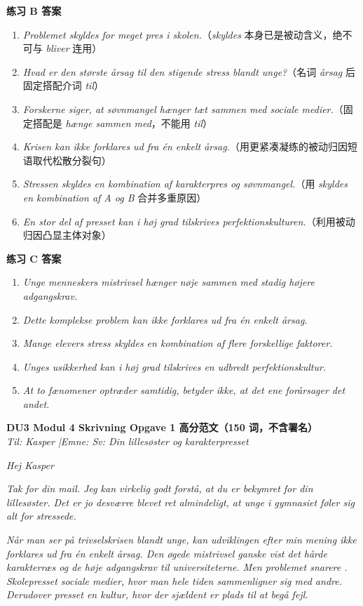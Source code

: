 \begin{answerbox}
\textbf{练习 B 答案}
\begin{enumerate}
  \item \textit{Problemet skyldes for meget pres i skolen.}（\textit{skyldes} 本身已是被动含义，绝不可与 \textit{bliver} 连用）
  \item \textit{Hvad er den største årsag til den stigende stress blandt unge?}（名词 \textit{årsag} 后固定搭配介词 \textit{til}）
  \item \textit{Forskerne siger, at søvnmangel hænger tæt sammen med sociale medier.}（固定搭配是 \textit{hænge sammen med}，不能用 \textit{til}）
  \item \textit{Krisen kan ikke forklares ud fra én enkelt årsag.}（用更紧凑凝练的被动归因短语取代松散分裂句）
  \item \textit{Stressen skyldes en kombination af karakterpres og søvnmangel.}（用 \textit{skyldes en kombination af A og B} 合并多重原因）
  \item \textit{En stor del af presset kan i høj grad tilskrives perfektionskulturen.}（利用被动归因凸显主体对象）
\end{enumerate}

\textbf{练习 C 答案}
\begin{enumerate}
  \item \textit{Unge menneskers mistrivsel hænger nøje sammen med stadig højere adgangskrav.}
  \item \textit{Dette komplekse problem kan ikke forklares ud fra én enkelt årsag.}
  \item \textit{Mange elevers stress skyldes en kombination af flere forskellige faktorer.}
  \item \textit{Unges usikkerhed kan i høj grad tilskrives en udbredt perfektionskultur.}
  \item \textit{At to fænomener optræder samtidig, betyder ikke, at det ene forårsager det andet.}
\end{enumerate}

\textbf{DU3 Modul 4 Skrivning Opgave 1 高分范文（150 词，不含署名）}\\
\textit{Til: Kasper \quad|\quad Emne: Sv: Din lillesøster og karakterpresset}

\textit{Hej Kasper}

\textit{Tak for din mail. Jeg kan virkelig godt forstå, at du er bekymret for din lillesøster. Det er jo desværre blevet ret almindeligt, at unge i gymnasiet føler sig alt for stressede.}

\textit{Når man ser på trivselskrisen blandt unge, kan udviklingen efter min mening ikke forklares ud fra én enkelt årsag. Den øgede mistrivsel  ganske vist  det hårde karakterræs og de høje adgangskrav til universiteterne. Men problemet  snarere . Skolepresset  sociale medier, hvor man hele tiden sammenligner sig med andre. Derudover  presset  en kultur, hvor der sjældent er plads til at begå fejl.}


\end{answerbox}
